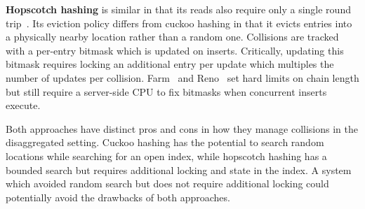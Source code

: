 \textbf{Hopscotch hashing} is similar in that its reads also require only a single round
trip~\cite{hopscotch,farm}. Its eviction policy differs from cuckoo hashing in that it evicts
entries into a physically nearby location rather than a random one. Collisions are tracked with a
per-entry bitmask which is updated on inserts. Critically, updating this bitmask requires locking an
additional entry per update which multiples the number of updates per collision. Farm~\cite{farm}
and Reno~\cite{reno} set hard limits on chain length but still require a server-side CPU to fix
bitmasks when concurrent inserts execute.

Both approaches have distinct pros and cons in how they manage collisions in the disaggregated
setting. Cuckoo hashing has the potential to search random locations while searching for an open
index, while hopscotch hashing has a bounded search but requires additional locking and state in the
index. A system which avoided random search but does not require additional locking could
potentially avoid the drawbacks of both approaches.






